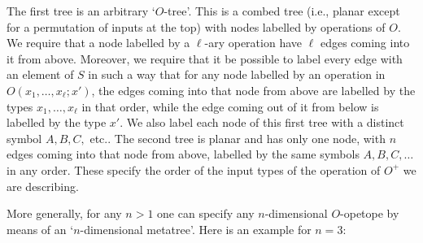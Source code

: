 \noindent The first tree is an arbitrary `$O$-tree'.  This is a
combed tree (i.e., planar except for a permutation of inputs at the top)
with nodes labelled by operations of $O$.  We require that a node
labelled by a $\ell$-ary operation have $\ell$ edges coming into it from
above.  Moreover, we require that it be possible to label every edge
with an element of $S$ in such a way that for any node labelled by an
operation in $O(x_1,\dots,x_\ell;x')$, the edges coming into that node
from above are labelled by the types $x_1,\dots,x_\ell$ in that order,
while the edge coming out of it from below is labelled by the type $x'$.
We also label each node of this first tree with a distinct symbol
$A,B,C,$ etc..  The second tree is planar and has only one node, with
$n$ edges coming into that node from above, labelled by the same symbols
$A,B,C,\dots$ in any order.  These specify the order of the input types
of the operation of $O^+$ we are describing.

More generally, for any $n > 1$ one can specify any $n$-dimensional
$O$-opetope by means of an `$n$-dimensional metatree'.  Here is an
example for $n = 3$:

